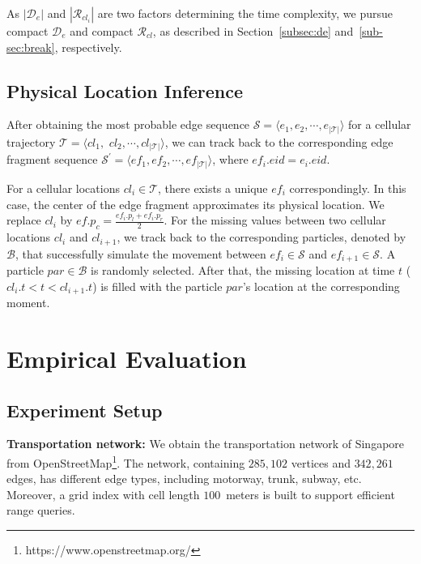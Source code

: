 \documentclass{vldb}
\begin{document}
	As $|\mathcal{D}_{e}|$ and $|\mathcal{R}_{cl_i}|$ are two factors determining the time complexity, we pursue compact $\mathcal{D}_e$ and compact $\mathcal{R}_{cl}$, as described in Section~\ref{subsec:de} and~\ref{sub-sec:break}, respectively.
	
	\subsection{Physical Location Inference}
	\label{sub:sec:physical-location}
	
	After obtaining the most probable edge sequence $\mathcal{S}=\langle e_1, e_2, \cdots, e_{|\mathcal{T}|} \rangle$ for a cellular trajectory $\mathcal{T}=\langle cl_1,$ $cl_2, \cdots, cl_{|\mathcal{T}|}\rangle$, we can track back to the corresponding edge fragment sequence $\mathcal{S}^\prime=\langle ef_1, ef_2, \cdots, ef_{|\mathcal{T}|} \rangle$, where $ef_i.eid=e_i.eid$.
	
	For a cellular locations $cl_i\in \mathcal{T}$, there exists a unique $ef_i$ correspondingly.
	In this case, the center of the edge fragment approximates its physical location.
	We replace $cl_i$ by  $ef.p_c=\frac{ef_i.p_l+ef_i.p_r}{2}$.
	For the missing values between two cellular locations $cl_i$ and $cl_{i+1}$, we track back to the corresponding particles, denoted by $\mathcal{B}$, that successfully simulate the movement between $ef_i\in\mathcal{S}$ and $ef_{i+1}\in\mathcal{S}$.
	A particle $par\in\mathcal{B}$ is randomly selected.
	After that, the missing location at time $t$ ($cl_i.t<t<cl_{i+1}.t$) is filled with the particle $par$'s location at the corresponding moment.
		
	\vspace{-3pt}
	\section{Empirical Evaluation}
	\label{sec:evaluation}
	\vspace{-3pt}
	
	\subsection{Experiment Setup}
	
	\textbf{Transportation network:} We obtain the transportation network of Singapore 
	from OpenStreetMap\footnote{https://www.openstreetmap.org/}.
	The network, containing $285,102$ vertices and $342,261$ edges, has different edge types, including motorway, trunk, subway, etc.
	Moreover, a grid index with cell length $100$~meters is built to support efficient range queries. 
	
\end{document}
